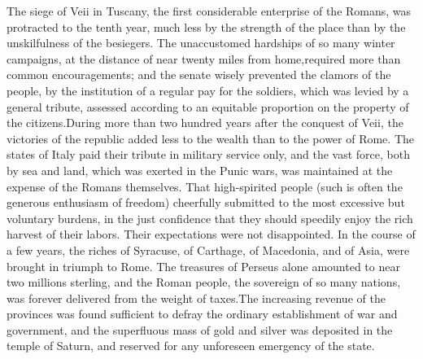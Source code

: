 The siege of Veii in Tuscany, the first considerable enterprise
of the Romans, was protracted to the tenth year, much less by the
strength of the place than by the unskilfulness of the besiegers.
The unaccustomed hardships of so many winter campaigns, at the
distance of near twenty miles from home,\footnotemark[81] required more than
common encouragements; and the senate wisely prevented the
clamors of the people, by the institution of a regular pay for
the soldiers, which was levied by a general tribute, assessed
according to an equitable proportion on the property of the
citizens.\footnotemark[82] During more than two hundred years after the
conquest of Veii, the victories of the republic added less to the
wealth than to the power of Rome. The states of Italy paid their
tribute in military service only, and the vast force, both by sea
and land, which was exerted in the Punic wars, was maintained at
the expense of the Romans themselves. That high-spirited people
(such is often the generous enthusiasm of freedom) cheerfully
submitted to the most excessive but voluntary burdens, in the
just confidence that they should speedily enjoy the rich harvest
of their labors. Their expectations were not disappointed. In the
course of a few years, the riches of Syracuse, of Carthage, of
Macedonia, and of Asia, were brought in triumph to Rome. The
treasures of Perseus alone amounted to near two millions
sterling, and the Roman people, the sovereign of so many nations,
was forever delivered from the weight of taxes.\footnotemark[83] The increasing
revenue of the provinces was found sufficient to defray the
ordinary establishment of war and government, and the superfluous
mass of gold and silver was deposited in the temple of Saturn,
and reserved for any unforeseen emergency of the state.\footnotemark[84]



